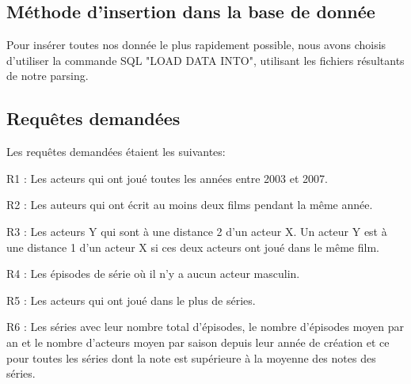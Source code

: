 \documentclass[10pt,a4paper]{article}
\begin{document}
\subsection{Méthode d'insertion dans la base de donnée}

Pour insérer toutes nos donnée le plus rapidement possible, nous avons choisis d'utiliser la commande SQL "LOAD DATA INTO", utilisant les fichiers résultants de notre parsing.


\subsection{Requêtes demandées}
Les requêtes demandées étaient les suivantes:
\begin{list}{-}{}
  \item R1 : Les acteurs qui ont joué toutes les années entre 2003 et
    2007.
  \item R2 : Les auteurs qui ont écrit au moins deux films pendant la
    même année.
  \item R3 : Les acteurs Y qui sont à une distance 2 d'un acteur X. Un
    acteur Y est à une distance 1 d'un acteur X si ces deux acteurs
    ont joué dans le même film.
  \item R4 : Les épisodes de série où il n'y a aucun acteur masculin.
  \item R5 : Les acteurs qui ont joué dans le plus de séries.
  \item R6 : Les séries avec leur nombre total d'épisodes, le nombre
    d'épisodes moyen par an et le nombre d'acteurs moyen par saison
    depuis leur année de création et ce pour toutes les séries dont la
    note est supérieure à la moyenne des notes des séries.
\end{list}
\end{document}
